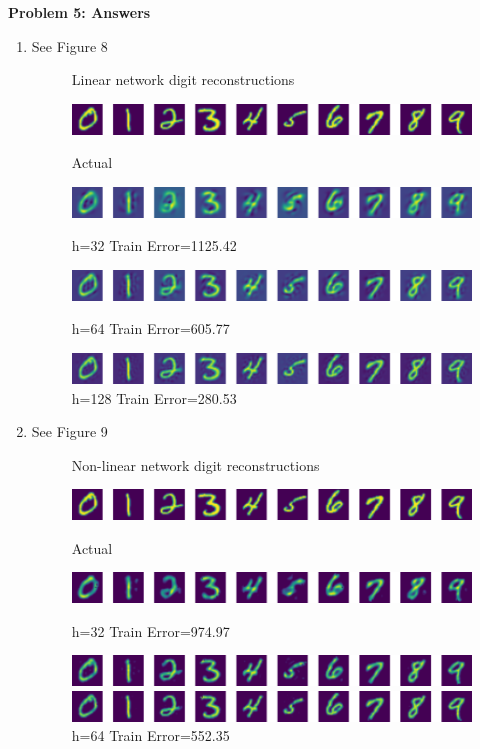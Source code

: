 {\bf Problem 5: Answers}

\begin{enumerate}
    \item See Figure 8
	\begin{figure}[h!]
	    \centering
	    \caption{Linear network digit reconstructions} 
	    \includegraphics[width=0.8\linewidth]{../figures/a5_True_actual.pdf}
	    \caption*{Actual}
	    \includegraphics[width=0.8\linewidth]{../figures/a5_True_32.pdf}
	    \caption*{h=32 Train Error=1125.42}
	    \includegraphics[width=0.8\linewidth]{../figures/a5_True_64.pdf}
	    \caption*{h=64 Train Error=605.77}
	    \includegraphics[width=0.8\linewidth]{../figures/a5_True_128.pdf}
	    \caption*{h=128 Train Error=280.53}	
	\end{figure}
    \item See Figure 9
	\begin{figure}[h!]
	    \centering
	    \caption{Non-linear network digit reconstructions} 
	    \includegraphics[width=0.8\linewidth]{../figures/a5_False_actual.pdf}
	    \caption*{Actual}
	    \includegraphics[width=0.8\linewidth]{../figures/a5_False_32.pdf}
	    \caption*{h=32 Train Error=974.97}
	    \includegraphics[width=0.8\linewidth]{../figures/a5_False_64.pdf}
	    \caption*{h=64 Train Error=552.35}
	    \includegraphics[width=0.8\linewidth]{../figures/a5_False_128.pdf}

\end{figure}
\end{enumerate}
